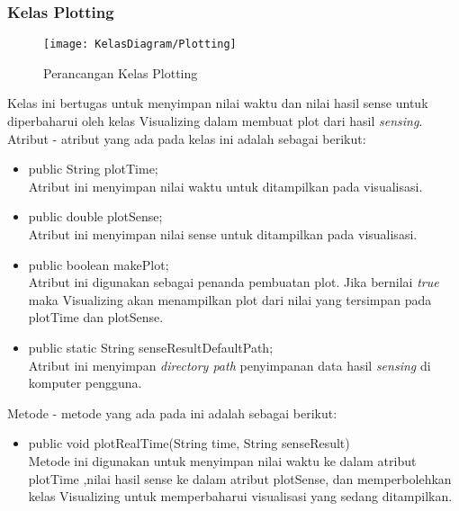 \subsubsection{Kelas Plotting}
\begin{figure}[H]
	\centering
	\texttt{[image: KelasDiagram/Plotting]}  
	\caption[Perancangan Kelas Plotting]{Perancangan Kelas Plotting} 
	\label{fig:KelasPlotting} 
\end{figure}
Kelas ini bertugas untuk menyimpan nilai waktu dan nilai hasil sense untuk diperbaharui oleh kelas Visualizing dalam membuat plot dari hasil {\it sensing}. Atribut - atribut yang ada pada kelas ini adalah sebagai berikut:
\begin{itemize}
	\item public String plotTime; \\
		Atribut ini menyimpan nilai waktu untuk ditampilkan pada visualisasi. 
	\item public double plotSense; \\
		Atribut ini menyimpan nilai sense untuk ditampilkan pada visualisasi.
	\item public boolean makePlot; \\
		Atribut ini digunakan sebagai penanda pembuatan plot. Jika bernilai 
		{\it true} maka Visualizing akan menampilkan plot dari nilai yang tersimpan pada plotTime dan plotSense.
	\item public static String senseResultDefaultPath; \\
		Atribut ini menyimpan {\it directory path} penyimpanan data hasil 
		{\it sensing} di komputer pengguna.
		
\end{itemize}
Metode - metode yang ada pada ini adalah sebagai berikut:
\begin{itemize}
	\item public void plotRealTime(String time, String senseResult) \\
		Metode ini digunakan untuk menyimpan nilai waktu ke dalam atribut plotTime ,nilai hasil sense ke dalam atribut plotSense, dan memperbolehkan kelas Visualizing untuk memperbaharui visualisasi yang sedang ditampilkan. 
\end{itemize}

